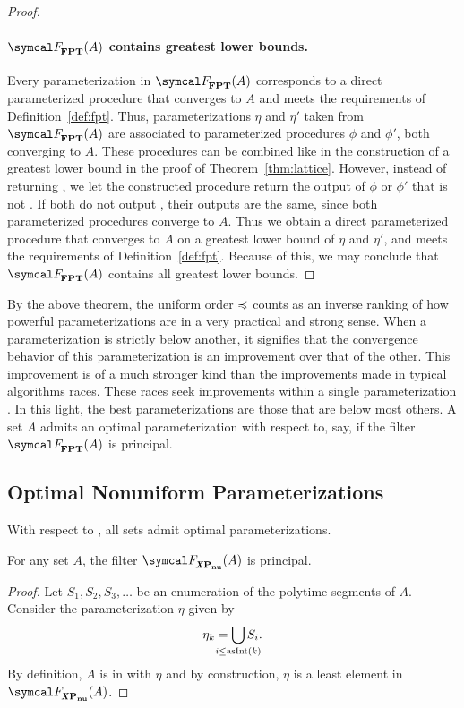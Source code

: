 \begin{proof}
  \paragraph{$\calF_\cl{FPT}(A)$ contains greatest lower bounds.}
  Every parameterization in $\calF_\cl{FPT}(A)$ corresponds to a direct parameterized procedure that converges to $A$ and meets the requirements of Definition~\ref{def:fpt}.
  Thus, parameterizations $\eta$ and $\eta'$ taken from $\calF_\cl{FPT}(A)$ are associated to parameterized procedures $\phi$ and $\phi'$, both converging to $A$.
  These procedures can be combined like in the construction of a greatest lower bound in the proof of Theorem~\ref{thm:lattice}.
  However, instead of returning , we let the constructed procedure return the output of $\phi$ or $\phi'$ that is not .
  If both do not output , their outputs are the same, since both parameterized procedures converge to $A$.
  Thus we obtain a direct parameterized procedure that converges to $A$ on a greatest lower bound of $\eta$ and $\eta'$, and meets the requirements of Definition~\ref{def:fpt}.
  Because of this, we may conclude that $\calF_\cl{FPT}(A)$ contains all greatest lower bounds.
\end{proof}

By the above theorem, the uniform order $\preccurlyeq$ counts as an inverse ranking of how powerful parameterizations are in a very practical and strong sense.
When a parameterization is strictly below another, it signifies that the convergence behavior of this parameterization is an improvement over that of the other.
This improvement is of a much stronger kind than the improvements made in typical algorithms races.
These races seek improvements within a single parameterization \parencite{komusiewicz2012new,fellows2013towards}.
In this light, the best parameterizations are those that are below most others.
A set $A$ admits an optimal parameterization with respect to, say,  if the filter $\calF_\cl{FPT}(A)$ is principal.

\subsection{Optimal Nonuniform Parameterizations}
With respect to , all sets admit optimal parameterizations.
\begin{theorem}
\label{thm:nuxpprincipal}%
  For any set $A$, the filter $\calF_\clXnu{P}(A)$ is principal.
\end{theorem}
\begin{proof}
  Let $S_1, S_2, S_3, \ldots$ be an enumeration of the polytime-segments of $A$.
  Consider the parameterization $\eta$ given by
  \begin{equation*}
    \eta_k \deq \bigcup_{\mathclap{i \le \asNat(k)}} S_i.
  \end{equation*}
  By definition, $A$ is in  with $\eta$ and by construction, $\eta$ is a least element in $\calF_\clXnu{P}(A)$.
\end{proof}

